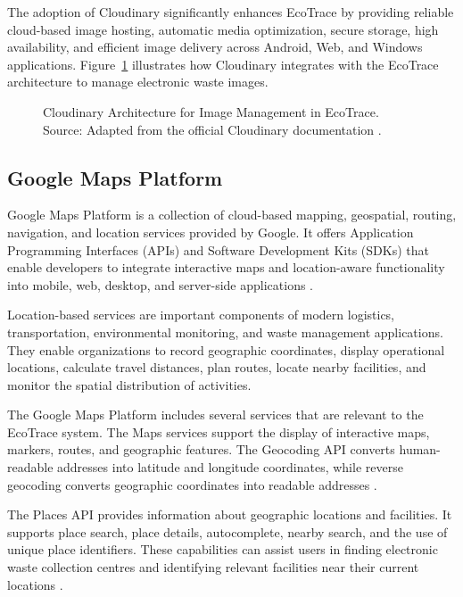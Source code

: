 The adoption of Cloudinary significantly enhances EcoTrace by providing
reliable cloud-based image hosting, automatic media optimization, secure storage,
high availability, and efficient image delivery across Android, Web, and Windows
applications. Figure~\ref{fig:cloudinary-arch} illustrates how Cloudinary integrates
with the EcoTrace architecture to manage electronic waste images.

\begin{figure}[H]
  \centering
  \caption{Cloudinary Architecture for Image Management in EcoTrace. Source: Adapted from the official Cloudinary documentation \citep{cloudinary2025}.}
  \label{fig:cloudinary-arch}
\end{figure}

\subsection{Google Maps Platform}

Google Maps Platform is a collection of cloud-based mapping, geospatial, routing,
navigation, and location services provided by Google. It offers Application
Programming Interfaces (APIs) and Software Development Kits (SDKs) that enable
developers to integrate interactive maps and location-aware functionality into
mobile, web, desktop, and server-side applications \citep{google2026maps}.

Location-based services are important components of modern logistics,
transportation, environmental monitoring, and waste management applications.
They enable organizations to record geographic coordinates, display operational
locations, calculate travel distances, plan routes, locate nearby facilities, and
monitor the spatial distribution of activities.

The Google Maps Platform includes several services that are relevant to the
EcoTrace system. The Maps services support the display of interactive maps,
markers, routes, and geographic features. The Geocoding API converts
human-readable addresses into latitude and longitude coordinates, while reverse
geocoding converts geographic coordinates into readable addresses
\citep{google2026geocoding}.

The Places API provides information about geographic locations and facilities.
It supports place search, place details, autocomplete, nearby search, and the use
of unique place identifiers. These capabilities can assist users in finding electronic
waste collection centres and identifying relevant facilities near their current
locations \citep{google2026places}.

